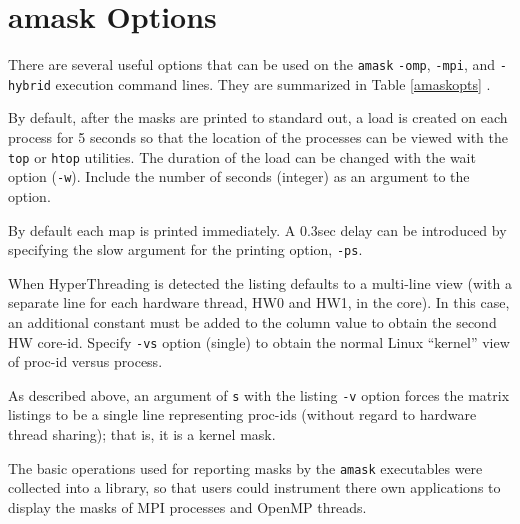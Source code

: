 \documentclass[10pt,a4paper]{report}
\begin{document}
\clearpage



\section{amask Options}
There are several useful options that can be used on the \verb+amask+ \verb+-omp+, \verb+-mpi+, and
\verb+-hybrid+ execution command lines.  They are summarized in Table \ref{amaskopts} .

By default, after the masks are printed to standard out, a load is created on each process
for 5 seconds so that the location of the processes can be viewed with the \verb+top+ or \verb+htop+ 
utilities. The duration of the load can be changed with the wait option (\verb+-w+). Include
the number of seconds (integer) as an argument to the option. 

By default each map is printed immediately. A 0.3sec delay can be introduced  by specifying
the slow argument for the printing option, \verb+-ps+.

When HyperThreading is detected the listing defaults to a multi-line view (with a
separate line for each hardware thread, HW0 and HW1, in the core).  
In this case, an additional constant must be added to the column value to obtain the second HW core-id.
Specify \verb+-vs+ option (single) to obtain the normal Linux ``kernel'' view of
proc-id versus process.


As described above, an argument of \verb+s+ with the listing \verb+-v+ option forces the 
matrix listings to be a single line representing proc-ids (without regard to hardware thread sharing);
that is, it is a kernel mask.


The basic operations used for reporting masks by the \verb+amask+ executables
were collected into a library, so that users
could instrument there own applications to display the masks of MPI processes
and OpenMP threads.
\end{document}
